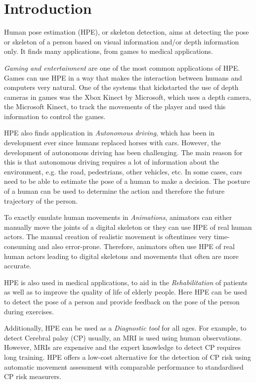 \chapter{Introduction}
\setcounter{page}{1}
Human pose estimation (HPE), or skeleton detection, aims at detecting the pose or skeleton of a person based on visual information and/or depth information only. It finds many applications, from games to medical applications\cite{kumarapu2020animepose, ClinicalApplicationChen, MedicalAnimation}. 

\textit{Gaming and entertainment} are one of the most common applications of HPE. Games can use HPE in a way that makes the interaction between humans and computers very natural. One of the systems that kickstarted the use of depth cameras in games was the Xbox Kinect by Microsoft, which uses a depth camera, the Microsoft Kinect, to track the movements of the player and used this information to control the games.

HPE also finds application in \textit{Autonomous driving}, which has been in development ever since humans replaced horses with cars\cite{OldAutoDrive}. However, the development of autonomous driving has been challenging. The main reason for this is that autonomous driving requires a lot of information about the environment, e.g. the road, pedestrians, other vehicles, etc. In some cases, cars need to be able to estimate the pose of a human to make a decision. The posture of a human can be used to determine the action and therefore the future trajectory of the person. 

To exactly emulate human movements in \textit{Animations}, animators can either manually move the joints of a digital skeleton or they can use HPE of real human actors. The manual creation of realistic movement is oftentimes very time-consuming and also error-prone. Therefore, animators often use HPE of real human actors leading to digital skeletons and movements that often are more accurate.

HPE is also used in medical applications, to aid in the \textit{Rehabilitation} of patients as well as to improve the quality of life of elderly people. Here HPE can be used to detect the pose of a person and provide feedback on the pose of the person during exercises\cite{ClinicalApplicationChen}. 

Additionally, HPE can be used as a \textit{Diagnostic tool} for all ages. For example, to detect Cerebral palsy (CP) usually, an MRI is used using human observations. However, MRIs are expensive and the expert knowledge to detect CP requires long training. HPE offers a low-cost alternative for the detection of CP risk using automatic movement assessment with comparable performance to standardised CP risk measurers\cite{Stenum2021ApplicationsOP}.

